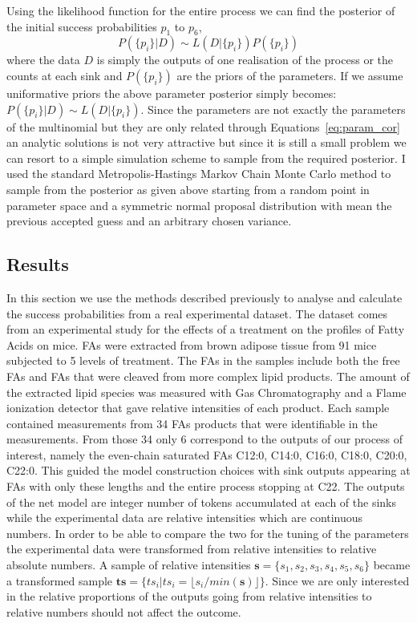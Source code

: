 Using the likelihood function for the entire process we can find the
posterior of the initial success probabilities $p_1$ to $p_6$,
\begin{equation*}
P(\{p_i\} | D) \sim L(D | \{p_i\}) P(\{p_i\})
\end{equation*}
where the data $D$ is simply the outputs of one realisation of the
process or the counts at each sink and $P(\{p_i\})$ are the priors of
the parameters. If we assume uniformative priors the above parameter
posterior simply becomes: $P(\{p_i\} | D) \sim L(D | \{p_i\})$. Since
the parameters are not exactly the parameters of the multinomial but
they are only related through Equations~\ref{eq:param_cor} an analytic
solutions is not very attractive but since it is still a small problem
we can resort to a simple simulation scheme to sample from the required
posterior. I used the standard Metropolis-Hastings Markov Chain Monte Carlo method to
sample from the posterior as given above starting from a random point
in parameter space and a symmetric normal proposal distribution with
mean the previous accepted guess and an arbitrary chosen variance.


\subsection{Results}
In this section we use the methods described previously to analyse and
calculate the success probabilities from a real experimental
dataset. The dataset comes from an experimental study for the effects
of a treatment on the profiles of Fatty Acids on mice. FAs
were extracted from brown adipose tissue from 91 mice subjected to 5
levels of treatment. The FAs in the samples include both the free FAs
and FAs that were cleaved from more complex lipid products. The amount
of the extracted lipid species was measured with Gas Chromatography
and a Flame ionization detector that gave relative intensities of each
product. Each sample contained measurements from 34 FAs products that
were identifiable in the measurements. From those 34 only 6 correspond
to the outputs of our process of interest, namely the even-chain saturated FAs
C12:0, C14:0, C16:0, C18:0, C20:0, C22:0. This guided the model
construction choices with sink outputs appearing at FAs with only these
lengths and the entire process stopping at C22. The outputs of the net model are integer number of tokens accumulated
at each of the sinks while the experimental
data are relative intensities which are continuous numbers. In order
to be able to compare the two for the tuning of the parameters the
experimental data were transformed from relative intensities to
relative absolute numbers. A sample of relative
intensities $\mathbf{s} = \{s_1, s_2, s_3, s_4, s_5, s_6\}$ became a
transformed sample $\mathbf{ts} = \{ ts_i | ts_i = \lfloor s_i /
min(\mathbf{s}) \rfloor \}$.
 Since we are only interested in the
relative proportions of the outputs going from relative intensities to
relative numbers should not affect the outcome.

